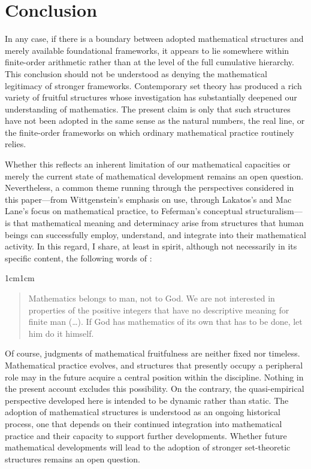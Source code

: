 \documentclass[11pt,a4paper]{book}
\theoremstyle{plain}
\begin{document}
\section{Conclusion}
\label{Conclusion-chapter2}

In any case, if there is a boundary between adopted mathematical structures and merely available foundational frameworks, it appears to lie somewhere within finite-order arithmetic rather than at the level of the full cumulative hierarchy. This conclusion should not be understood as denying the mathematical legitimacy of stronger frameworks. Contemporary set theory has produced a rich variety of fruitful structures whose investigation has substantially deepened our understanding of mathematics. The present claim is only that such structures have not been adopted in the same sense as the natural numbers, the real line, or the finite-order frameworks on which ordinary mathematical practice routinely relies.

Whether this reflects an inherent limitation of our mathematical capacities or merely the current state of mathematical development remains an open question. Nevertheless, a common theme running through the perspectives considered in this paper—from Wittgenstein's emphasis on use, through Lakatos's and Mac Lane's focus on mathematical practice, to Feferman's conceptual structuralism—is that mathematical meaning and determinacy arise from structures that human beings can successfully employ, understand, and integrate into their mathematical activity. In this regard, I share, at least in spirit, although not necessarily in its specific content, the following words of \textcite[p. 2]{Bishop1967}:

\begin{adjustwidth}{1cm}{1cm}
\small
\begin{quote}
Mathematics belongs to man, not to God. We are not interested in properties of the positive integers that have no descriptive meaning for finite man (\dots). If God has mathematics of its own that has to be done, let him do it himself. 
\end{quote}
\end{adjustwidth}

Of course, judgments of mathematical fruitfulness are neither fixed nor timeless. Mathematical practice evolves, and structures that presently occupy a peripheral role may in the future acquire a central position within the discipline. Nothing in the present account excludes this possibility. On the contrary, the quasi-empirical perspective developed here is intended to be dynamic rather than static. The adoption of mathematical structures is understood as an ongoing historical process, one that depends on their continued integration into mathematical practice and their capacity to support further developments. Whether future mathematical developments will lead to the adoption of stronger set-theoretic structures remains an open question.
\end{document}
